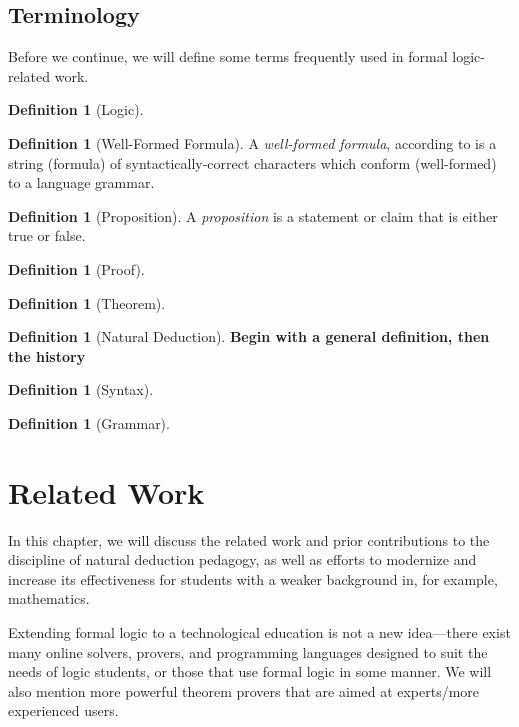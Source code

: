 \documentclass[ms]{uncgdissertationexp2}
\theoremstyle{plain}
\theoremstyle{definition}
\newtheorem{definition}[theorem]{Definition}
\theoremstyle{remark}
\begin{document}
\section{Terminology}
Before we continue, we will define some terms frequently used in formal logic-related work.
\begin{definition}[Logic]

\end{definition}

\begin{definition}[Well-Formed Formula]
	A \textit{well-formed formula}, according to \cite{encyclopedia} is a string (formula) of syntactically-correct characters which conform (well-formed) to a language grammar.
\end{definition}
    
\begin{definition}[Proposition]
	A \textit{proposition} is a statement or claim that is either true or false.
\end{definition}

\begin{definition}[Proof]
\end{definition}
    
\begin{definition}[Theorem]
\end{definition}

\begin{definition}[Natural Deduction]
	\textbf{Begin with a general definition, then the history}
\end{definition}

\begin{definition}[Syntax]
\end{definition}

\begin{definition}[Grammar]
\end{definition}

\chapter{Related Work}\label{chapter:2}
In this chapter, we will discuss the related work and prior contributions to the discipline of natural deduction pedagogy, as well as efforts to modernize and increase its effectiveness for students with a weaker background in, for example, mathematics. 

Extending formal logic to a technological education is not a new idea---there exist many online solvers, provers, and programming languages designed to suit the needs of logic students, or those that use formal logic in some manner. We will also mention more powerful theorem provers that are aimed at experts/more experienced users.
\end{document}

